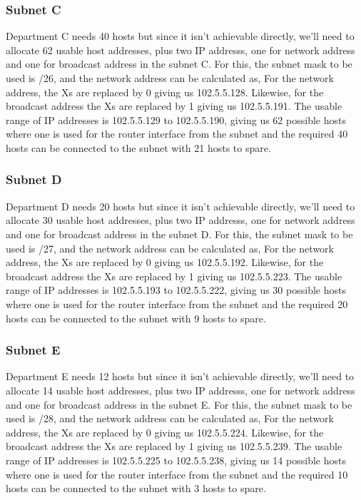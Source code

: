 \documentclass{home_assignment}
\begin{document}
\subsubsection*{Subnet C}
Department C needs 40 hosts but since it isn't achievable directly, we'll need to allocate 62 usable host addresses, plus two IP addresss, one for network address and one for broadcast address in the subnet C.
For this, the subnet mask to be used is /26, and the network address can be calculated as,
For the network address, the Xs are replaced by 0 giving us 102.5.5.128. Likewise, for the broadcast address the Xs are replaced by 1 giving us 102.5.5.191. The usable range of IP addresses is 102.5.5.129 to 102.5.5.190, giving us 62 possible hosts where one is used for the router interface from the subnet and the required 40 hosts can be connected to the subnet with 21 hosts to spare.
\subsubsection*{Subnet D}
Department D needs 20 hosts but since it isn't achievable directly, we'll need to allocate 30 usable host addresses, plus two IP addresss, one for network address and one for broadcast address in the subnet D.
For this, the subnet mask to be used is /27, and the network address can be calculated as,
For the network address, the Xs are replaced by 0 giving us 102.5.5.192. Likewise, for the broadcast address the Xs are replaced by 1 giving us 102.5.5.223. The usable range of IP addresses is 102.5.5.193 to 102.5.5.222, giving us 30 possible hosts where one is used for the router interface from the subnet and the required 20 hosts can be connected to the subnet with 9 hosts to spare.
\subsubsection*{Subnet E}
Department E needs 12 hosts but since it isn't achievable directly, we'll need to allocate 14 usable host addresses, plus two IP addresss, one for network address and one for broadcast address in the subnet E.
For this, the subnet mask to be used is /28, and the network address can be calculated as,
For the network address, the Xs are replaced by 0 giving us 102.5.5.224. Likewise, for the broadcast address the Xs are replaced by 1 giving us 102.5.5.239. The usable range of IP addresses is 102.5.5.225 to 102.5.5.238, giving us 14 possible hosts where one is used for the router interface from the subnet and the required 10 hosts can be connected to the subnet with 3 hosts to spare.
\end{document}
